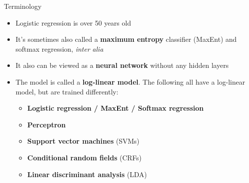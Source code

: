 \documentclass[xcolor=pdftex,x11names,table,hyperref]{beamer}
\begin{document}
\begin{frame}{Terminology}
\begin{itemize}
	\item Logistic regression is over 50 years old
	\pause
	\item It's sometimes also called a \textbf{maximum entropy} classifier (MaxEnt) and softmax regression, \textit{inter alia}
	\item It also can be viewed as a \textbf{neural network} without any hidden layers
	\pause
	\item The model is called a \textbf{log-linear model}.  The following all have a log-linear model, but are trained differently:
	\begin{itemize}
		\item \textbf{Logistic regression / MaxEnt / Softmax regression}
		\item \textbf{Perceptron}
		\item \textbf{Support vector machines} (SVMs)
		\item \textbf{Conditional random fields} (CRFs)
		\item \textbf{Linear discriminant analysis} (LDA)
	\end{itemize}
\end{itemize}
\end{frame}




\end{document}

